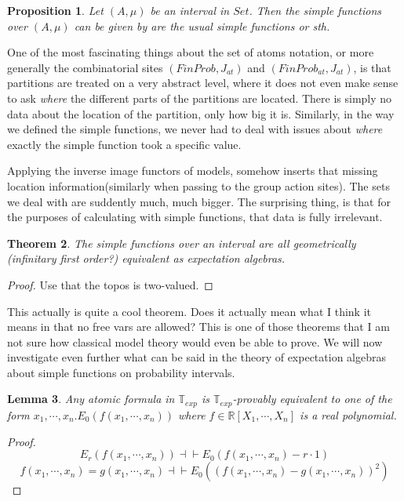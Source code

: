 \documentclass[a4paper]{amsproc}
\theoremstyle{plain}
\newtheorem{theorem}{Theorem}[section]
\newtheorem{proposition}[theorem]{Proposition}
\newtheorem{lemma}[theorem]{Lemma}
\theoremstyle{definition}
\theoremstyle{remark}
\numberwithin{equation}{section}
\begin{document}
\begin{proposition}
    Let $(A,\mu)$ be an interval in $Set$. Then the simple functions over $(A,\mu)$ can be given by are the usual simple functions or sth.
\end{proposition}

One of the most fascinating things about the set of atoms notation, or more generally the combinatorial sites $(FinProb,J_{at})$ and $(FinProb_{at}, J_{at})$, is that partitions are treated on a very abstract level, where it does not even make sense to ask \emph{where} the different parts of the partitions are located. There is simply no data about the location of the partition, only how big it is. Similarly, in the way we defined the simple functions, we never had to deal with issues about \emph{where} exactly the simple function took a specific value.

Applying the inverse image functors of models, somehow inserts that missing location information(similarly when passing to the group action sites). The sets we deal with are suddently much, much bigger. The surprising thing, is that for the purposes of calculating with simple functions, that data is fully irrelevant.

\begin{theorem}
    The simple functions over an interval are all geometrically (infinitary first order?) equivalent as expectation algebras.
\end{theorem}
\begin{proof}
    Use that the topos is two-valued.
\end{proof}


This actually is quite a cool theorem. Does it actually mean what I think it means in that no free vars are allowed? This is one of those theorems that I am not sure how classical model theory would even be able to prove.\newline
\indent We will now investigate even further what can be said in the theory of expectation algebras about simple functions on probability intervals.
\begin{lemma} Any atomic formula in $\mathbb{T}_{exp}$ is $\mathbb{T}_{exp}$-provably equivalent to one of the form $x_1,\cdots, x_n. E_0(f(x_1,\cdots,x_n))$ where $f\in \mathbb{R}[X_1,\cdots, X_n]$ is a real polynomial. 
\end{lemma}
\begin{proof}
\[ E_r(f(x_1,\cdots, x_n))\dashv \vdash E_0(f(x_1,\cdots, x_n)-r\cdot 1)    \]
\[ f(x_1,\cdots, x_n)=g(x_1,\cdots ,x_n)\dashv\vdash E_0((f(x_1,\cdots, x_n)-g(x_1,\cdots ,x_n))^2)  \]
\end{proof}
\end{document}
